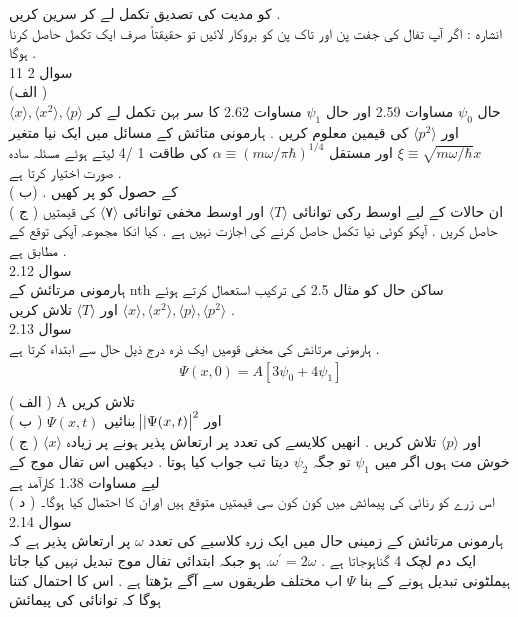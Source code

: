 \documentclass{book}
\begin{document}
کو مدیت کی تصدیق  تکمل لے کر سرین کریں .\\
انشاره : اگر آپ تفال کی جفت پن اور تاک پن کو بروکار لائیں تو حقیقتاً صرف ایک تکمل حاصل کرنا ہوگا .\\
سوال
2 11\\
(الف )\\
حال
\(\psi_{0}\)
مساوات
2.59
اور حال
\(\psi_{1}\)
مساوات
2.62
کا سر بہن تکمل لے کر
\(\langle x \rangle , \langle x^{2} \rangle , \langle p \rangle \)
اور
\(\langle p^{2} \rangle \)
کی قیمین معلوم کریں .
ہارمونی متائش کے مسائل میں ایک نیا متغیر
\(\xi\equiv\sqrt{m\omega/\hbar}x\)
اور مستقل
\(\alpha\equiv (m\omega/\pi\hbar)^{1/4}\)
کی طاقت
1 /4
لیتے ہوئے مسئلہ سادہ صورت اختیار کرتا ہے .\\
( ب) . کے حصول کو پر کھیں\\
( ج ) ان حالات کے لیے اوسط رکی توانائی
\(\langle T \rangle\)
اور اوسط مخفی توانائی
\(\langle ٧ \rangle\)
کی قیمتیں حاصل کریں .
آپکو کوئی نیا تکمل حاصل کرنے کی اجازت نہیں ہے . کیا انکا مجموعہ آپکی توقع کے مطابق ہے .\\
سوال
2.12\\
ہارمونی مرتائش کے
nth
ساکن حال کو مثال
2.5
کی ترکیب استعمال کرتے ہوئے
\(\langle x \rangle , \langle x^{2} \rangle , \langle p \rangle , \langle p^{2} \rangle\)
اور
\(\langle T \rangle\)
تلاش کریں .\\
سوال
2.13\\
ہارمونی مرتانش کی مخفی قومیں ایک ذرہ درج ذیل حال سے ابتداء کرتا ہے .
\begin{align*}
\Psi(x,0)=A[3\psi_{0}+4\psi_{1}]\\
\end{align*}
( الف )
A
تلاش کریں\\
( ب )
\(\Psi(x,t)\)
اور
\(\abs{|\Psi(x,t)}^{2}\)
بنائیں\\
( ج )
\(\langle x \rangle\)
اور
\(\langle p \rangle\)
تلاش کریں . انھیں کلایسے کی تعدد پر ارتعاش پذیر ہونے پر زیادہ خوش مت ہوں اگر میں
\(\psi_{1}\)
تو جگہ
\(\psi_{2}\)
دیتا تب جواب کیا ہوتا . دیکھیں اس تفال موج کے لیے مساوات
1.38
کارآمد ہے\\
( د ) اس زرے کو رنائی کی پیمائش میں کون کون سی قیمتیں متوقع ہیں اوران کا احتمال کیا ہوگا۔\\
سوال
2.14\\
ہارمونی مرتائش کے زمینی حال میں ایک زرہ کلاسیے کی تعدد
\(\omega\)
پر ارتعاش پذیر ہے کہ ایک دم لچک
4
گناہوجاتا ہے .
\(\omega^{\prime}=2\omega\).
ہو جبکہ ابتدائی تفال موج تبدیل نہیں کیا جاتا ہیملٹونی تبدیل ہونے کے بنا
\(\Psi\)
اب مختلف طریقوں سے آگے بڑھتا ہے . اس کا احتمال کتنا ہوگا کہ توانائی کی پیمائش
\end{document}
